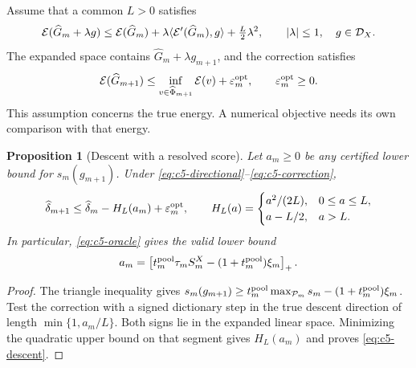 \documentclass[11pt]{article}
\newtheorem{proposition}[theorem]{Proposition}
\theoremstyle{remark}
\begin{document}
Assume that a common $L>0$ satisfies
\begin{equation}
 \mathcal E(\widehat G_m+\lambda g)
 \leq\mathcal E(\widehat G_m)+\lambda\langle\mathcal E'(\widehat G_m),g\rangle
            +\tfrac L2\lambda^2,\qquad |\lambda|\leq1,\quad g\in\mathcal D_X.
 \label{eq:c5-directional}
\end{equation}
The expanded space contains $\widehat G_m+\lambda g_{m+1}$, and the
correction satisfies
\begin{equation}
 \mathcal E(\widehat G_{m+1})\leq
 \inf_{v\in\widehat\Phi_{m+1}}\mathcal E(v)+\varepsilon_m^{\rm opt},
 \qquad \varepsilon_m^{\rm opt}\geq0 .
 \label{eq:c5-correction}
\end{equation}
This assumption concerns the true energy. A numerical objective needs its
own comparison with that energy.

\begin{proposition}[Descent with a resolved score]
\label{prop:c5-descent}
Let $a_m\geq0$ be any certified lower bound for $s_m(g_{m+1})$.
Under \eqref{eq:c5-directional}--\eqref{eq:c5-correction},
\begin{equation}
 \widehat\delta_{m+1}\leq\widehat\delta_m-H_L(a_m)
                       +\varepsilon_m^{\rm opt},\qquad
 H_L(a)=
 \begin{cases}a^2/(2L),&0\leq a\leq L,\\a-L/2,&a>L.\end{cases}
 \label{eq:c5-descent}
\end{equation}
In particular, \eqref{eq:c5-oracle} gives the valid lower bound
\begin{equation}
 a_m=\left[t_m^{\rm pool}\tau_m S_m^X
                 -(1+t_m^{\rm pool})\xi_m\right]_+ .
 \label{eq:c5-score-lower}
\end{equation}
\end{proposition}
\begin{proof}
The triangle inequality gives
$s_m(g_{m+1})\geq
t_m^{\rm pool}\max_{\mathcal P_m}s_m-(1+t_m^{\rm pool})\xi_m$.
Test the correction with a signed dictionary step in the true descent
direction of length $\min\{1,a_m/L\}$. Both signs lie in the expanded
linear space. Minimizing the quadratic upper bound on that segment
gives $H_L(a_m)$ and proves \eqref{eq:c5-descent}.
\end{proof}
\end{document}
